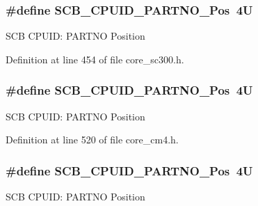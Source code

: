 \subsubsection[{\texorpdfstring{S\+C\+B\+\_\+\+C\+P\+U\+I\+D\+\_\+\+P\+A\+R\+T\+N\+O\+\_\+\+Pos}{SCB_CPUID_PARTNO_Pos}}]{\setlength{\rightskip}{0pt plus 5cm}\#define S\+C\+B\+\_\+\+C\+P\+U\+I\+D\+\_\+\+P\+A\+R\+T\+N\+O\+\_\+\+Pos~4U}\hypertarget{group___c_m_s_i_s___s_c_b_ga705f68eaa9afb042ca2407dc4e4629ac}{}\label{group___c_m_s_i_s___s_c_b_ga705f68eaa9afb042ca2407dc4e4629ac}
S\+CB C\+P\+U\+ID\+: P\+A\+R\+T\+NO Position 

Definition at line 454 of file core\+\_\+sc300.\+h.

\subsubsection[{\texorpdfstring{S\+C\+B\+\_\+\+C\+P\+U\+I\+D\+\_\+\+P\+A\+R\+T\+N\+O\+\_\+\+Pos}{SCB_CPUID_PARTNO_Pos}}]{\setlength{\rightskip}{0pt plus 5cm}\#define S\+C\+B\+\_\+\+C\+P\+U\+I\+D\+\_\+\+P\+A\+R\+T\+N\+O\+\_\+\+Pos~4U}\hypertarget{group___c_m_s_i_s___s_c_b_ga705f68eaa9afb042ca2407dc4e4629ac}{}\label{group___c_m_s_i_s___s_c_b_ga705f68eaa9afb042ca2407dc4e4629ac}
S\+CB C\+P\+U\+ID\+: P\+A\+R\+T\+NO Position 

Definition at line 520 of file core\+\_\+cm4.\+h.

\subsubsection[{\texorpdfstring{S\+C\+B\+\_\+\+C\+P\+U\+I\+D\+\_\+\+P\+A\+R\+T\+N\+O\+\_\+\+Pos}{SCB_CPUID_PARTNO_Pos}}]{\setlength{\rightskip}{0pt plus 5cm}\#define S\+C\+B\+\_\+\+C\+P\+U\+I\+D\+\_\+\+P\+A\+R\+T\+N\+O\+\_\+\+Pos~4U}\hypertarget{group___c_m_s_i_s___s_c_b_ga705f68eaa9afb042ca2407dc4e4629ac}{}\label{group___c_m_s_i_s___s_c_b_ga705f68eaa9afb042ca2407dc4e4629ac}
S\+CB C\+P\+U\+ID\+: P\+A\+R\+T\+NO Position 

